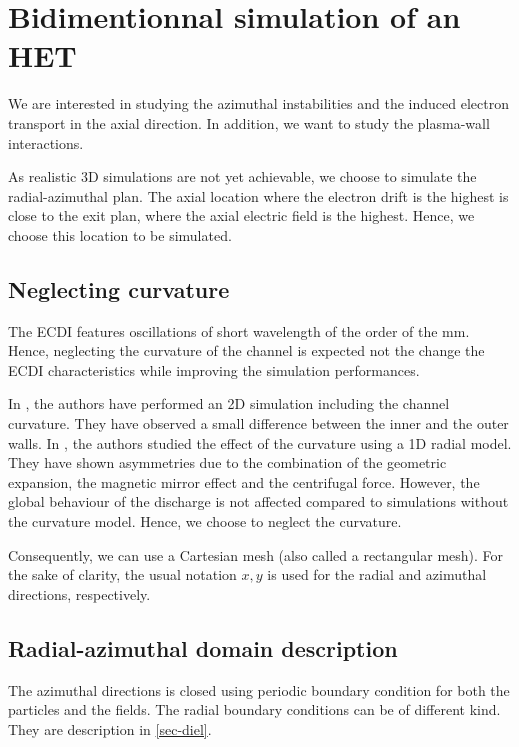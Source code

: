 
\section{Bidimentionnal simulation of an \ac{HET}}

We are interested in studying the azimuthal instabilities and the induced electron transport in the axial direction.
In addition, we want to study the plasma-wall interactions.

As realistic \ac{3D} simulations are not yet achievable, we choose to simulate the radial-azimuthal plan.
The axial location where the electron drift is the highest is close to the exit plan, where the axial electric field is the highest.
Hence, we choose this location to be simulated.


\subsection{Neglecting curvature}
The \ac{ECDI} features oscillations of short wavelength of the order of the mm.
Hence, neglecting the curvature of the channel is expected not the change the \ac{ECDI} characteristics while improving the simulation performances.

In  \citet{heron2013},  the authors have performed an \ac{2D} simulation including the channel curvature.
They have observed a small difference between the inner and the outer walls.
In  \citet{dominguez-vazquez2018}, the authors studied the effect of the curvature using a \ac{1D} radial model.
They have shown asymmetries due to the combination of the geometric expansion, the magnetic mirror effect and the centrifugal force.
However, the global behaviour of the discharge is not affected compared to simulations without the curvature model.
Hence, we choose to neglect the curvature.

Consequently, we can use a Cartesian mesh (also called a rectangular mesh).
For the sake of clarity, the usual notation $x,y$ is used for the radial and azimuthal directions, respectively.

\subsection{Radial-azimuthal domain description}


The azimuthal directions is closed using periodic boundary condition for both the particles and the fields.
The radial boundary conditions can be of different kind.
They are description in \cref{sec-diel}.

